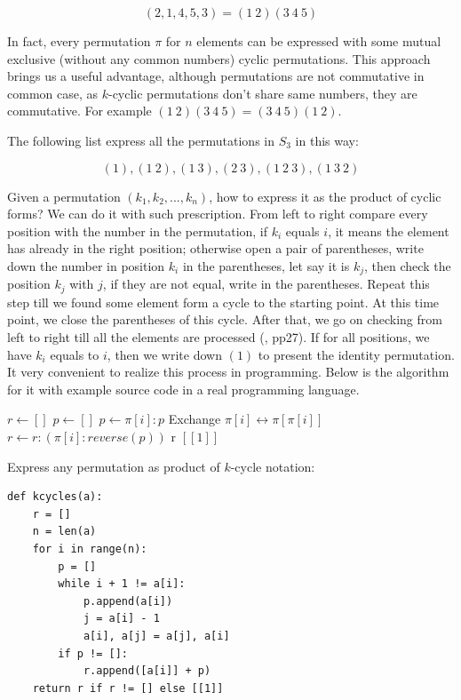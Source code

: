 \documentclass[b5paper]{article}
\begin{document}
\[
(2, 1, 4, 5, 3) = (1\ 2)(3\ 4\ 5)
\]

In fact, every permutation $\pi$ for $n$ elements can be expressed with some mutual exclusive (without any common numbers) cyclic permutations. This approach brings us a useful advantage, although permutations are not commutative in common case, as $k$-cyclic permutations don't share same numbers, they are commutative. For example $(1\ 2)(3\ 4\ 5) = (3\ 4\ 5)(1\ 2)$.

The following list express all the permutations in $S_3$ in this way:

\[
(1),
(1\ 2), (1\ 3), (2\ 3),
(1\ 2\ 3), (1\ 3\ 2)
\]

Given a permutation $(k_1, k_2, ..., k_n)$, how to express it as the product of cyclic forms? We can do it with such prescription. From left to right compare every position with the number in the permutation, if $k_i$ equals $i$, it means the element has already in the right position; otherwise open a pair of parentheses, write down the number in position $k_i$ in the parentheses, let say it is $k_j$, then check the position $k_j$ with $j$, if they are not equal, write in the parentheses. Repeat this step till we found some element form a cycle to the starting point. At this time point, we close the parentheses of this cycle. After that, we go on checking from left to right till all the elements are processed (\cite{Armstrong1988}, pp27). If for all positions, we have $k_i$ equals to $i$, then we write down $(1)$ to present the identity permutation. It very convenient to realize this process in programming. Below is the algorithm for it with example source code in a real programming language.

\begin{algorithmic}
  \State $r \gets []$
    \State $p \gets []$
      \State $p \gets \pi[i]:p$
      \State Exchange $\pi[i] \leftrightarrow \pi[\pi[i]]$
    \EndWhile
      \State $r \gets r:(\pi[i]:reverse(p))$
    \EndIf
  \EndFor
    \State \Return r
  \Else
    \State \Return $[[1]]$ 
  \EndIf
\EndFunction
\end{algorithmic}

Express any permutation as product of $k$-cycle notation:

\lstset{language=Python}
\begin{lstlisting}
def kcycles(a):
    r = []
    n = len(a)
    for i in range(n):
        p = []
        while i + 1 != a[i]:
            p.append(a[i])
            j = a[i] - 1
            a[i], a[j] = a[j], a[i]
        if p != []:
            r.append([a[i]] + p)
    return r if r != [] else [[1]]
\end{lstlisting}
\end{document}
